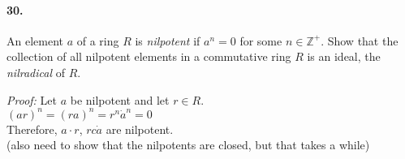 \documentclass[10pt,a4paper]{article}
\begin{document}
\paragraph{30.} An element $a$ of a ring $R$ is \textit{nilpotent} if $a^n=0$ for some $n \in \mathbb{Z}^+$. Show that the collection of all nilpotent elements in a commutative ring $R$ is an ideal, the \textit{nilradical} of $R$.

\begin{flushleft}
\textit{Proof:} Let $a$ be nilpotent and let $r \in R$.\\
$(ar)^n = (ra)^n= r^n \dot a^n = 0$\\
Therefore, $a \cdot r$, $r c\dot a$ are nilpotent.\\
(also need to show that the nilpotents are closed, but that takes a while)
\end{flushleft}
\end{document}
